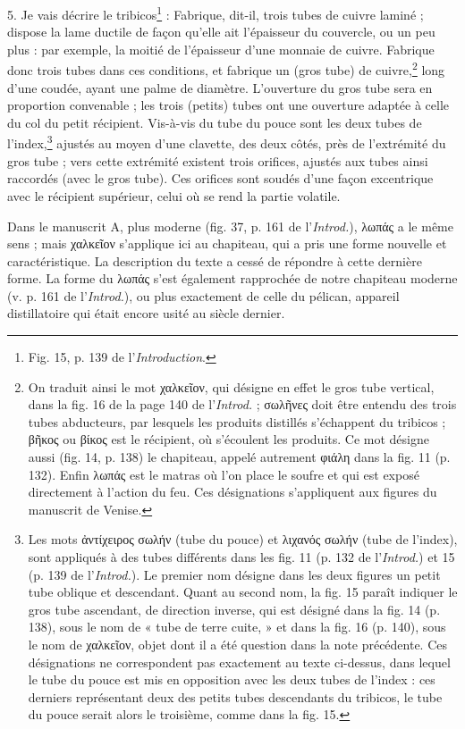 \documentclass[a4paper, 11pt, oneside, polutonikogreek, french]{article}
\begin{document}
5. Je vais décrire le tribicos\footnote{Fig. 15, p. 139 de l'\emph{Introduction}.} : Fabrique, dit-il, trois tubes de cuivre laminé ; dispose la lame ductile de façon qu'elle ait l'épaisseur du couvercle, ou un peu plus : par exemple, la moitié de l'épaisseur d'une monnaie de cuivre. Fabrique donc trois tubes dans ces conditions, et fabrique un (gros tube) de cuivre,\footnote{On traduit ainsi le mot χαλκεῖον, qui désigne en effet le gros tube vertical, dans la fig. 16 de la page 140 de l'\emph{Introd.} ; σωλῆνες doit être entendu des trois tubes abducteurs, par lesquels les produits distillés s'échappent du tribicos ; βῆκος ou βίκος est le récipient, où s'écoulent les produits. Ce mot désigne aussi (fig. 14, p. 138) le chapiteau, appelé autrement φιάλη dans la fig. 11 (p. 132). Enfin λωπάς est le matras où l'on place le soufre et qui est exposé directement à l'action du feu. Ces désignations s'appliquent aux figures du manuscrit de Venise.  } long d'une coudée, ayant une palme de diamètre. L'ouverture du gros tube sera en proportion convenable ; les trois (petits) tubes ont une ouverture adaptée à celle du col du petit récipient. Vis-à-vis du tube du pouce sont les deux tubes de l'index,\footnote{Les mots ἀντίχειρος σωλήν (tube du pouce) et λιχανός σωλήν (tube de l'index), sont appliqués à des tubes différents dans les fig. 11 (p. 132 de l'\emph{Introd.}) et 15 (p. 139 de l'\emph{Introd.}). Le premier nom désigne dans les deux figures un petit tube oblique et descendant. Quant au second nom, la fig. 15 paraît indiquer le gros tube ascendant, de direction inverse, qui est désigné dans la fig. 14 (p. 138), sous le nom de « tube de terre cuite, » et dans la fig. 16 (p. 140), sous le nom de χαλκεῖον, objet dont il a été question dans la note précédente. Ces désignations ne correspondent pas exactement au texte ci-dessus, dans lequel le tube du pouce est mis en opposition avec les deux tubes de l'index : ces derniers représentant deux des petits tubes descendants du tribicos, le tube du pouce serait alors le troisième, comme dans la fig. 15.} ajustés au moyen d'une clavette, des deux côtés, près de l'extrémité du gros tube ; vers cette extrémité existent trois orifices, ajustés aux tubes ainsi raccordés (avec le gros tube). Ces orifices sont soudés d'une façon excentrique avec le récipient supérieur, celui où se rend la partie volatile.

Dans le manuscrit A, plus moderne (fig. 37, p. 161 de l'\emph{Introd.}), λωπάς a le même sens ; mais χαλκεῖον s'applique ici au chapiteau, qui a pris une forme nouvelle et caractéristique. La description du texte a cessé de répondre à cette dernière forme. La forme du λωπάς s'est également rapprochée de notre chapiteau moderne (v. p. 161 de l'\emph{Introd.}), ou plus exactement de celle du pélican, appareil distillatoire qui était encore usité au siècle dernier.
\end{document}
